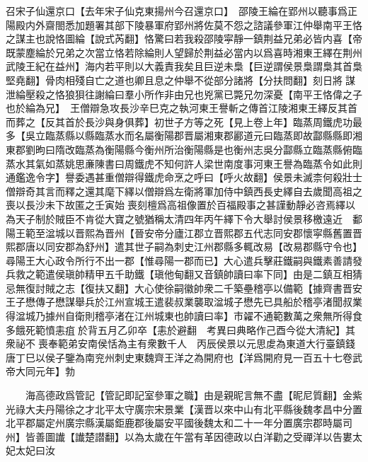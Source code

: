 召宋子仙還京口【去年宋子仙克東揚州今召還京口】　邵陵王綸在郢州以聽事爲正陽殿内外齋閤悉加題署其部下陵暴軍府郢州將佐莫不怨之諮議參軍江仲舉南平王恪之謀主也說恪圖綸【說式芮翻】恪驚曰若我殺邵陵寜靜一鎮荆益兄弟必皆内喜【帝既蒙塵綸於兄弟之次當立恪若除綸則人望歸於荆益必當内以爲喜時湘東王繹在荆州武陵王紀在益州】海内若平則以大義責我矣且巨逆未梟【巨逆謂侯景梟謂梟其首梟堅堯翻】骨肉相殘自亡之道也卿且息之仲舉不從部分諸將【分扶問翻】刻日將謀泄綸壓殺之恪狼狽往謝綸曰羣小所作非由兄也兇黨已斃兄勿深憂【南平王恪偉之子也於綸為兄】　王僧辯急攻長沙辛巳克之執河東王譽斬之傳首江陵湘東王繹反其首而葬之【反其首於長沙與身俱葬】初世子方等之死【見上卷上年】臨蒸周鐵虎功最多【吳立臨蒸縣以縣臨蒸水而名屬衡陽郡晋屬湘東郡酈道元曰臨蒸即故酃縣縣即湘東郡劉昫曰隋改臨蒸為衡陽縣今衡州所治衡陽縣是也衡州志吳分酃縣立臨蒸縣俯臨蒸水其氣如蒸姚思亷陳書曰周鐵虎不知何許人梁世南度事河東王譽為臨蒸令如此則通鑑逸令字】譽委遇甚重僧辯得鐵虎命烹之呼曰【呼火故翻】侯景未滅柰何殺壯士僧辯奇其言而釋之還其麾下繹以僧辯爲左衛將軍加侍中鎮西長史繹自去歲聞高祖之喪以長沙未下故匿之壬寅始喪刻檀爲高祖像置於百福殿事之甚謹動靜必咨焉繹以為天子制於賊臣不肯從大寶之號猶稱太清四年丙午繹下令大舉討侯景移檄遠近　鄱陽王範至湓城以晋熙為晋州【晉安帝分廬江郡立晋熙郡五代志同安郡懷寜縣舊置晋熙郡唐以同安郡為舒州】遣其世子嗣為刺史江州郡縣多輒改易【改易郡縣守令也】尋陽王大心政令所行不出一郡【惟尋陽一郡而已】大心遣兵擊莊鐵嗣與鐵素善請發兵救之範遣侯瑱帥精甲五千助鐵【瑱他甸翻又音鎮帥讀曰率下同】由是二鎮互相猜忌無復討賊之志【復扶又翻】大心使徐嗣徽帥衆二千築壘稽亭以備範【據齊書晋安王子懋傳子懋謀舉兵於江州宣城王遣裴叔業襲取湓城子懋先已具船於稽亭渚聞叔業得湓城乃據州自衛則稽亭渚在江州城東也帥讀曰率】市糴不通範數萬之衆無所得食多餓死範憤恚疽於背五月乙卯卒【恚於避翻　考異曰典略作己酉今從大清紀】其衆祕不喪奉範弟安南侯恬為主有衆數千人　丙辰侯景以元思䖍為東道大行臺鎮錢唐丁巳以侯子鑒為南兖州刺史東魏齊王洋之為開府也【洋爲開府見一百五十七卷武帝大同元年】勃

　　海高德政爲管記【管記即記室參軍之職】由是親昵言無不盡【昵尼質翻】金紫光祿大夫丹陽徐之才北平太守廣宗宋景業【漢晋以來中山有北平縣後魏孝昌中分置北平郡屬定州廣宗縣漢屬鉅鹿郡後屬安平國後魏太和二十一年分置廣宗郡時屬司州】皆善圖䜟【䜟楚譛翻】以為太歲在午當有革因德政以白洋勸之受禪洋以告婁太妃太妃曰汝

